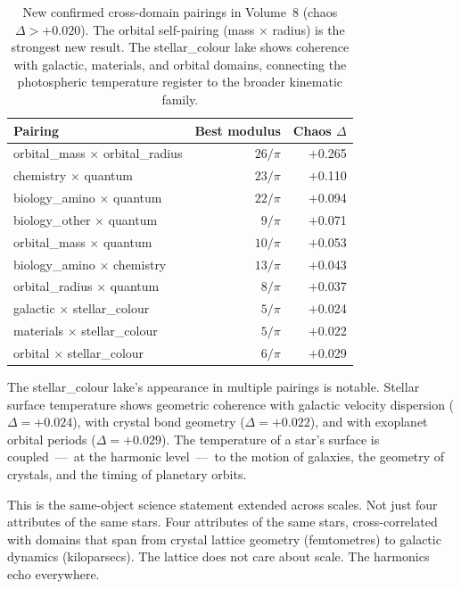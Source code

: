 \documentclass[11pt, letterpaper, openany]{book}
\begin{document}
\begin{table}[H]
\centering
\renewcommand{\arraystretch}{1.3}
\begin{tabular}{|l|r|r|}
\hline
\rowcolor{kishblue!10}
\textbf{Pairing} & \textbf{Best modulus} & \textbf{Chaos $\Delta$} \\
\hline\hline
orbital\_mass $\times$ orbital\_radius & $26/\pi$ & $+$0.265 \\
chemistry $\times$ quantum             & $23/\pi$ & $+$0.110 \\
biology\_amino $\times$ quantum        & $22/\pi$ & $+$0.094 \\
biology\_other $\times$ quantum        & $9/\pi$  & $+$0.071 \\
orbital\_mass $\times$ quantum         & $10/\pi$ & $+$0.053 \\
biology\_amino $\times$ chemistry      & $13/\pi$ & $+$0.043 \\
orbital\_radius $\times$ quantum       & $8/\pi$  & $+$0.037 \\
galactic $\times$ stellar\_colour      & $5/\pi$  & $+$0.024 \\
materials $\times$ stellar\_colour     & $5/\pi$  & $+$0.022 \\
orbital $\times$ stellar\_colour       & $6/\pi$  & $+$0.029 \\
\hline
\end{tabular}
\caption{New confirmed cross-domain pairings in Volume~8 (chaos $\Delta > +0.020$).
The orbital self-pairing (mass $\times$ radius) is the strongest new result. The
stellar\_colour lake shows coherence with galactic, materials, and orbital domains,
connecting the photospheric temperature register to the broader kinematic family.}
\label{tab:new_pairings}
\end{table}

The stellar\_colour lake's appearance in multiple pairings is notable. Stellar
surface temperature shows geometric coherence with galactic velocity dispersion
($\Delta = +0.024$), with crystal bond geometry ($\Delta = +0.022$), and with
exoplanet orbital periods ($\Delta = +0.029$). The temperature of a star's surface
is coupled~---~at the harmonic level~---~to the motion of galaxies, the geometry of
crystals, and the timing of planetary orbits.

This is the same-object science statement extended across scales. Not just four
attributes of the same stars. Four attributes of the same stars, cross-correlated
with domains that span from crystal lattice geometry (femtometres) to galactic
dynamics (kiloparsecs). The lattice does not care about scale. The harmonics echo
everywhere.
\end{document}

